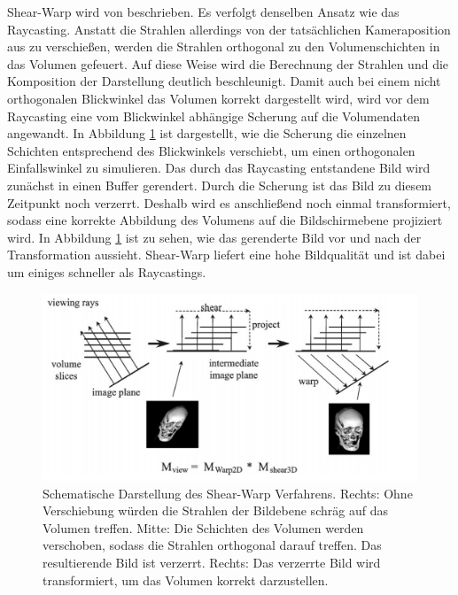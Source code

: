 Shear-Warp wird von \cite{Lacroute94} beschrieben. Es verfolgt denselben Ansatz wie das Raycasting. Anstatt die Strahlen allerdings von der tatsächlichen Kameraposition aus zu verschießen, werden die Strahlen orthogonal zu den Volumenschichten in das Volumen gefeuert. Auf diese Weise wird die Berechnung der Strahlen und die Komposition der Darstellung deutlich beschleunigt. 
Damit auch bei einem nicht orthogonalen Blickwinkel das Volumen korrekt dargestellt wird, wird vor dem Raycasting eine vom Blickwinkel abhängige Scherung auf die Volumendaten angewandt. In Abbildung \ref{img:shearwarp} ist dargestellt, wie die Scherung die einzelnen Schichten entsprechend des Blickwinkels verschiebt, um einen orthogonalen Einfallswinkel zu simulieren. 
Das durch das Raycasting entstandene Bild wird zunächst in einen Buffer gerendert. Durch die Scherung ist das Bild zu diesem Zeitpunkt noch verzerrt. Deshalb wird es anschließend noch einmal transformiert, sodass eine korrekte Abbildung des Volumens auf die Bildschirmebene projiziert wird. In Abbildung \ref{img:shearwarp} ist zu sehen, wie das gerenderte Bild vor und nach der Transformation aussieht. 
Shear-Warp liefert eine hohe Bildqualität und ist dabei um einiges schneller als Raycastings. 

\begin{figure}[!htb]
	\centering
	\includegraphics[width=0.7\linewidth]{images/shearwarp.png}
	\caption{Schematische Darstellung des Shear-Warp Verfahrens. Rechts: Ohne Verschiebung würden die Strahlen der Bildebene schräg auf das Volumen treffen. Mitte: Die Schichten des Volumen werden verschoben, sodass die Strahlen orthogonal darauf treffen. Das resultierende Bild ist verzerrt. Rechts: Das verzerrte Bild wird transformiert, um das Volumen korrekt darzustellen.}
	\label{img:shearwarp}
\end{figure}
\FloatBarrier

